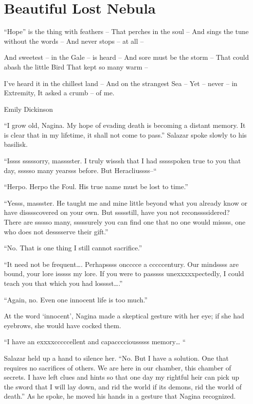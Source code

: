 \chapter{Beautiful Lost Nebula}

“Hope” is the thing with feathers –
That perches in the soul –
And sings the tune without the words –
And never stops – at all –

And sweetest – in the Gale – is heard –
And sore must be the storm –
That could abash the little Bird
That kept so many warm –

I’ve heard it in the chillest land –
And on the strangest Sea –
Yet – never – in Extremity,
It asked a crumb – of me.

Emily Dickinson

\simpleline


“I grow old, Nagina. My hope of evading death is becoming a distant memory. It is clear that in my lifetime, it shall not come to pass.” Salazar spoke slowly to his basilisk.

“Issss sssssorry, masssster. I truly wisssh that I had ssssspoken true to you that day, ssssso many yearsss before. But Heracliussss–“

“Herpo. Herpo the Foul. His true name must be lost to time.”

“Yesss, massster. He taught me and mine little beyond what you already know or have disssscovered on your own. But ssssstill, have you not reconssssidered? There are ssssso many, sssssurely you can find one that no one would missss, one who does not desssserve their gift.”

“No. That is one thing I still cannot sacrifice.”

“It need not be frequent…. Perhapssss oncccce a cccccentury. Our mindssss are bound, your lore isssss my lore. If you were to passsss unexxxxxpectedly, I could teach you that which you had losssst….”

“Again, no. Even one innocent life is too much.”

At the word ‘innocent’, Nagina made a skeptical gesture with her eye; if she had eyebrows, she would have cocked them.

“I have an exxxxcccccellent and capacccciousssss memory… “

Salazar held up a hand to silence her. “No. But I have a solution. One that requires no sacrifices of others. We are here in our chamber, this chamber of secrets. I have left clues and hints so that one day my rightful heir can pick up the sword that I will lay down, and rid the world if its demons, rid the world of death.” As he spoke, he moved his hands in a gesture that Nagina recognized.

